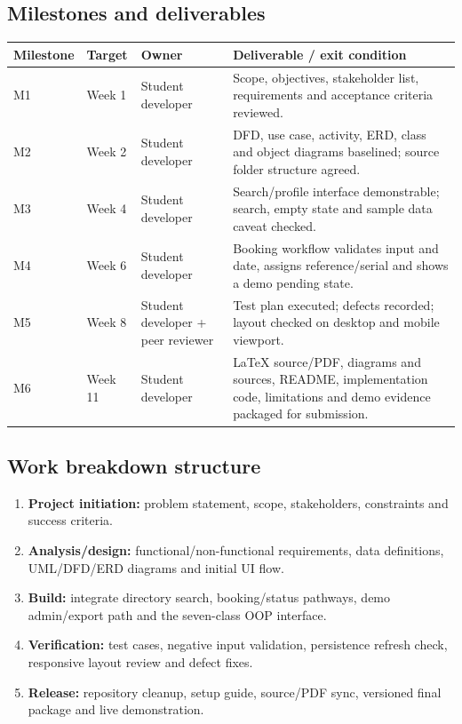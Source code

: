 \documentclass[11pt,a4paper]{article}
\begin{document}
\subsection{Milestones and deliverables}
\begin{longtable}{p{1.5cm}p{2.1cm}p{2.2cm}p{7.5cm}}
\toprule \textbf{Milestone} & \textbf{Target} & \textbf{Owner} & \textbf{Deliverable / exit condition}\\\midrule
M1 & Week 1 & Student developer & Scope, objectives, stakeholder list, requirements and acceptance criteria reviewed.\\
M2 & Week 2 & Student developer & DFD, use case, activity, ERD, class and object diagrams baselined; source folder structure agreed.\\
M3 & Week 4 & Student developer & Search/profile interface demonstrable; search, empty state and sample data caveat checked.\\
M4 & Week 6 & Student developer & Booking workflow validates input and date, assigns reference/serial and shows a demo pending state.\\
M5 & Week 8 & Student developer + peer reviewer & Test plan executed; defects recorded; layout checked on desktop and mobile viewport.\\
M6 & Week 11 & Student developer & LaTeX source/PDF, diagrams and sources, README, implementation code, limitations and demo evidence packaged for submission.\\
\bottomrule
\end{longtable}

\subsection{Work breakdown structure}
\begin{enumerate}
  \item \textbf{Project initiation:} problem statement, scope, stakeholders, constraints and success criteria.
  \item \textbf{Analysis/design:} functional/non-functional requirements, data definitions, UML/DFD/ERD diagrams and initial UI flow.
  \item \textbf{Build:} integrate directory search, booking/status pathways, demo admin/export path and the seven-class OOP interface.
  \item \textbf{Verification:} test cases, negative input validation, persistence refresh check, responsive layout review and defect fixes.
  \item \textbf{Release:} repository cleanup, setup guide, source/PDF sync, versioned final package and live demonstration.
\end{enumerate}
\end{document}
